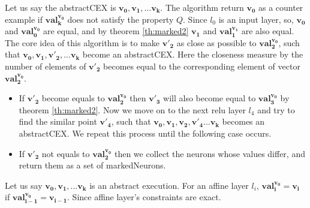 Let us say the abstractCEX is $\boldsymbol{v_0}, \boldsymbol{v_1}, ... \boldsymbol{v_k}$. 
The algorithm return $\boldsymbol{v_0}$ as a counter example if $\boldsymbol{val_k^{\boldsymbol{v_0}}}$ 
does not satisfy the property $Q$. 
Since $l_0$ is an input layer, so, $\boldsymbol{v_0}$ and $\boldsymbol{val_0^{v_0}}$ are equal, 
and by theorem \ref{th:marked2} $\boldsymbol{v_1}$ and $\boldsymbol{val_1^{v_1}}$ are also equal. 
The core idea of this algorithm is to make $\boldsymbol{v'_2}$ as close as possible to $\boldsymbol{val_2^{v_0}}$, 
such that $\boldsymbol{v_0}, \boldsymbol{v_1}, \boldsymbol{v'_2}, ... \boldsymbol{v_k}$ become an abstractCEX. 
Here the closeness measure by the number of elements of $\boldsymbol{v'_2}$ becomes equal to the 
corresponding element of vector $\boldsymbol{val_2^{v_0}}$.
\begin{itemize}
  \item If $\boldsymbol{v'_2}$ become equals to $\boldsymbol{val_2^{v_0}}$ then $\boldsymbol{v'_3}$ will also become 
    equal to $\boldsymbol{val_3^{v_0}}$ by theorem \ref{th:marked2}. 
    Now we move on to the next relu layer $l_4$ and try to find the similar point $\boldsymbol{v'_4}$, such that 
    $\boldsymbol{v_0}, \boldsymbol{v_1}, \boldsymbol{v_2}, \boldsymbol{v'_4}... \boldsymbol{v_k}$ becomes an abstractCEX. 
    We repeat this process until the following case occurs. 
  \item If $\boldsymbol{v'_2}$ not equals to $\boldsymbol{val_2^{v_0}}$ then we collect the neurons whose values differ, 
        and return them as a set of markedNeurons. 
\end{itemize}



\begin{theorem}
  \label{th:marked2}
  Let us say $\boldsymbol{v_0}, \boldsymbol{v_1}, ... \boldsymbol{v_k}$ is an abstract execution. 
  For an affine layer $l_i$, $\boldsymbol{val_i^{\boldsymbol{v_0}}} = \boldsymbol{v_i}$ if $\boldsymbol{val_{i-1}^{\boldsymbol{v_0}}} = \boldsymbol{v_{i-1}}$.  
  Since affine layer's constraints are exact.  
\end{theorem}
 

